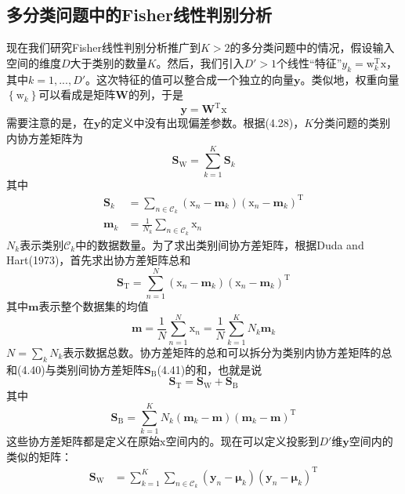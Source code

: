 \documentclass[b5paper]{book}
\numberwithin{equation}{chapter}
\newcommand {\bx} {\boldsymbol{\mathrm{x}}}
\newcommand {\bw} {\boldsymbol{\mathrm{w}}}
\newcommand {\rmT} {\mathrm{T}}
\newcommand {\bfMu} {\boldsymbol{\mu}}
\begin{document}
	\subsection{多分类问题中的Fisher线性判别分析}
	\textnormal{现在我们研究Fisher线性判别分析推广到$K>2$的多分类问题中的情况，假设输入空间的维度$D$大于类别的数量$K$。然后，我们引入$D'>1$个线性“特征”$y_k = \bw_k^{\rmT}\bx$，其中$k=1,...,D'$。这次特征的值可以整合成一个独立的向量$\mathbf{y}$。类似地，权重向量$\left\{\bw_k\right\}$可以看成是矩阵$\mathbf{W}$的列，于是
	\begin{equation}
		\mathbf{y} = \mathbf{W}^{\rmT}\bx
	\end{equation}
	需要注意的是，在$\mathbf{y}$的定义中没有出现偏差参数。根据(4.28)，$K$分类问题的类别内协方差矩阵为
	\begin{equation}
		\mathbf{S}_\mathrm{W} = \sum_{k=1}^K \mathbf{S}_k
	\end{equation}
	其中
	\begin{align}
		\mathbf{S}_k &= \sum_{n \in \mathcal{C}_k}(\bx_n - \mathbf{m}_k)(\bx_n - \mathbf{m}_k)^{\rmT} \\
		\mathbf{m}_k &= \frac{1}{N_k}\sum_{n \in \mathcal{C}_k}\bx_n
	\end{align}
	$N_k$表示类别$\mathcal{C}_k$中的数据数量。为了求出类别间协方差矩阵，根据Duda and Hart(1973)，首先求出协方差矩阵总和
	\begin{equation}
		\mathbf{S}_\mathrm{T} = \sum_{n=1}^N(\bx_n - \mathbf{m}_k)(\bx_n - \mathbf{m}_k)^{\rmT}
	\end{equation}
	其中$\mathbf{m}$表示整个数据集的均值
	\begin{equation}
		\mathbf{m} = \frac{1}{N} \sum_{n=1}^N\bx_n = \frac{1}{N}\sum_{k=1}^K N_k\mathbf{m}_k
	\end{equation}
	$N = \sum_k N_k$表示数据总数。协方差矩阵的总和可以拆分为类别内协方差矩阵的总和(4.40)与类别间协方差矩阵$\mathbf{S}_\mathrm{B}$(4.41)的和，也就是说
	\begin{equation}
		\mathbf{S}_\mathrm{T} = \mathbf{S}_\mathrm{W} + \mathbf{S}_\mathrm{B}
	\end{equation}
	其中
	\begin{equation}
		\mathbf{S}_\mathrm{B} = \sum_{k=1}^K N_k (\mathbf{m}_k - \mathbf{m})(\mathbf{m}_k - \mathbf{m})^{\rmT}
	\end{equation}
	这些协方差矩阵都是定义在原始$\bx$空间内的。现在可以定义投影到$D'$维$\mathbf{y}$空间内的类似的矩阵：
	\begin{align}
		\mathbf{S}_\mathrm{W} &= \sum_{k=1}^K \sum_{n \in \mathcal{C}_k}(\mathbf{y}_n - \bfMu_k)(\mathbf{y}_n - \bfMu_k)^{\rmT}\\

\end{align}}
\end{document}
